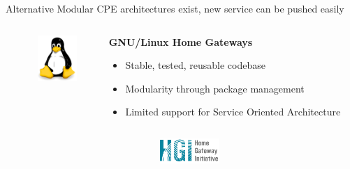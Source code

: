\documentclass[a4paper]{beamer}
\begin{document}
\begin{frame}{Alternative Modular CPE architectures exist, new service can be pushed easily}
							
							
	\begin{columns}[T]
		\begin{column}{.01\textwidth} %
		\end{column}
		\begin{column}[T]{0.15 \textwidth} 
			\vspace{1em}
			\includegraphics[width=4em]{tux.png}
		\end{column}
																						
																										
		\begin{column}[T]{0.70 \textwidth} 
																																							
																																								   
			\textbf{ GNU/Linux Home Gateways}
			\begin{itemize}
				\item Stable, tested, reusable codebase
				\item Modularity through package management
				\item Limited support for Service Oriented Architecture
			\end{itemize}
			\vspace{3mm}
																																								     
																																							
		\end{column}
																										
	\end{columns}
								
								
	\begin{columns}[T]
		\begin{column}{.01\textwidth} %
		\end{column}
		\begin{column}[T]{0.15 \textwidth} 
			\vspace{2em}
			\includegraphics[width=6em]{hgi.png}
		\end{column}
																						

\end{columns}
\end{frame}
\end{document}
